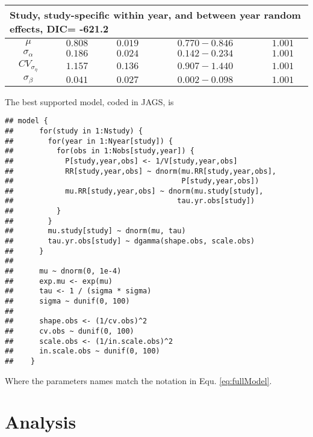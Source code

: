 \documentclass{article}\usepackage[]{graphicx}\usepackage[]{color}
\makeatletter
\newenvironment{kframe}{%
 \def\at@end@of@kframe{}%
 \ifinner\ifhmode%
  \def\at@end@of@kframe{\end{minipage}}%
  \begin{minipage}{\columnwidth}%
 \fi\fi%
 \def\FrameCommand##1{\hskip\@totalleftmargin \hskip-\fboxsep
 \colorbox{shadecolor}{##1}\hskip-\fboxsep
     \hskip-\linewidth \hskip-\@totalleftmargin \hskip\columnwidth}%
 \MakeFramed {\advance\hsize-\width
   \@totalleftmargin\z@ \linewidth\hsize
   \@setminipage}}%
 {\par\unskip\endMakeFramed%
 \at@end@of@kframe}
\newenvironment{knitrout}{}{} %
\makeatother
\begin{document}
\begin{table}
\begin{tabular}{|c|c|c|c|c|}
    \multicolumn{5}{|l|}{Study, study-specific within year,
      and between year random effects, DIC= -621.2} \\ \hline
     \multirow{1}{*}{$\mu$} &
    $0.808$ & $0.019$ & $0.770 - 0.846$ & $1.001$ \\ \hline
    \multirow{1}{*}{$\sigma_{\alpha}$} &
    $0.186$ & $0.024$ & $0.142 - 0.234$ & $1.001$ \\ \hline
   \multirow{1}{*}{$CV_{\sigma_\eta}$} &
    $1.157$ & $0.136$ & $0.907 - 1.440$ & $1.001$ \\ \hline
   \multirow{1}{*}{$\sigma_{\beta}$} &
    $0.041$ & $0.027$ & $0.002 - 0.098$ & $1.001$ \\ \hline

  \end{tabular}
\end{table}
\clearpage

The best supported model, coded in JAGS, is

\begin{knitrout}
\color{fgcolor}\begin{kframe}
\begin{verbatim}
## model {
##      for(study in 1:Nstudy) {
##        for(year in 1:Nyear[study]) {
##          for(obs in 1:Nobs[study,year]) {
##            P[study,year,obs] <- 1/V[study,year,obs]
##            RR[study,year,obs] ~ dnorm(mu.RR[study,year,obs],
##                                       P[study,year,obs])
##            mu.RR[study,year,obs] ~ dnorm(mu.study[study],
##                                      tau.yr.obs[study])
##          }
##        }
##        mu.study[study] ~ dnorm(mu, tau)
##        tau.yr.obs[study] ~ dgamma(shape.obs, scale.obs)
##      }
## 
##      mu ~ dnorm(0, 1e-4)
##      exp.mu <- exp(mu)
##      tau <- 1 / (sigma * sigma)
##      sigma ~ dunif(0, 100)
## 
##      shape.obs <- (1/cv.obs)^2
##      cv.obs ~ dunif(0, 100)
##      scale.obs <- (1/in.scale.obs)^2
##      in.scale.obs ~ dunif(0, 100)
##    }
\end{verbatim}
\end{kframe}
\end{knitrout}

Where the parameters names match the notation in
Equ. \ref{eq:fullModel}.

\section{Analysis}
\label{sec:analysis}
\end{document}
